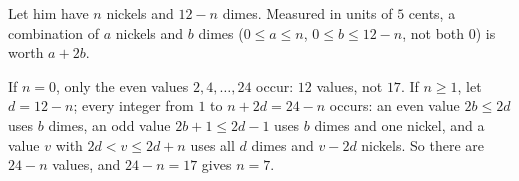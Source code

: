 Let him have $n$ nickels and $12-n$ dimes. Measured in units of $5$ cents, a combination of $a$ nickels and $b$ dimes ($0\le a\le n$, $0\le b\le12-n$, not both $0$) is worth $a+2b$.

If $n=0$, only the even values $2,4,\dots,24$ occur: $12$ values, not $17$. If $n\ge1$, let $d=12-n$; every integer from $1$ to $n+2d=24-n$ occurs: an even value $2b\le2d$ uses $b$ dimes, an odd value $2b+1\le2d-1$ uses $b$ dimes and one nickel, and a value $v$ with $2d<v\le2d+n$ uses all $d$ dimes and $v-2d$ nickels. So there are $24-n$ values, and $24-n=17$ gives $n=\boxed{7}$.
